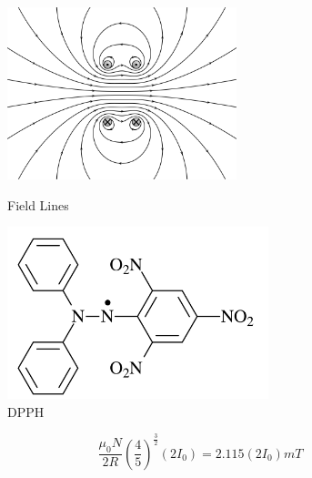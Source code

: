 \documentclass{amsart}
\begin{document}
\begin{figure}
    \begin{minipage}{0.45\textwidth}
        \centering
        \includegraphics[height=5cm]{coils.png}
        \caption{Field Lines}
        \label{fig:coils}
    \end{minipage}
    \begin{minipage}{0.45\textwidth}
        \centering
        \includegraphics[height=5cm]{dpph.png}
        \caption{DPPH}
        \label{fig:resonance}
    \end{minipage}
\end{figure}

\begin{equation}
    \dfrac{\mu_0 N}{2R}\left(\dfrac{4}{5}\right)^{\frac{3}{2}}(2I_0) = 2.115(2I_0)mT
    \label{eq:field}
\end{equation}
\end{document}
